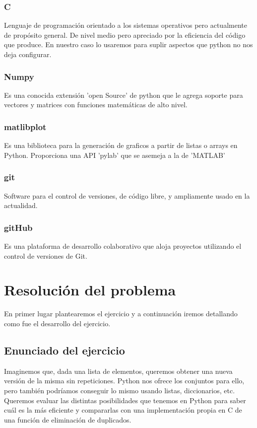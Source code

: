 \documentclass[10pt,journal,compsoc]{IEEEtran}
\begin{document}
\subsubsection{C}
Lenguaje de programación orientado a los sistemas operativos pero actualmente de propósito general. De nivel medio pero apreciado por la eficiencia del código que produce.
En nuestro caso lo usaremos para suplir aspectos que python no nos deja configurar.

\subsubsection{Numpy}
Es una conocida extensión 'open Source' de python que le agrega soporte para vectores y matrices con funciones matemáticas de alto nivel.

\subsubsection{matlibplot}
Es una biblioteca para la generación de graficos a partir de listas o arrays en Python.
Proporciona una API 'pylab' que se asemeja a la de 'MATLAB' 

\subsubsection{git}
Software para el control de versiones, de código libre, y ampliamente usado en la actualidad.

\subsubsection{gitHub}
Es una plataforma de desarrollo colaborativo que aloja proyectos utilizando el control de versiones de Git.


\section{Resolución del problema}
En primer lugar plantearemos el ejercicio y a continuación iremos detallando como fue el desarrollo del ejercicio.

\subsection{Enunciado del ejercicio}
Imaginemos que, dada una lista de elementos, queremos obtener una nueva versión de la misma sin repeticiones. Python nos ofrece los conjuntos para ello, pero también podríamos conseguir lo mismo usando listas, diccionarios, etc. Queremos evaluar las distintas posibilidades que tenemos en Python para saber cuál es la más eficiente y compararlas con una implementación propia en C de una función de eliminación de duplicados.
\end{document}
